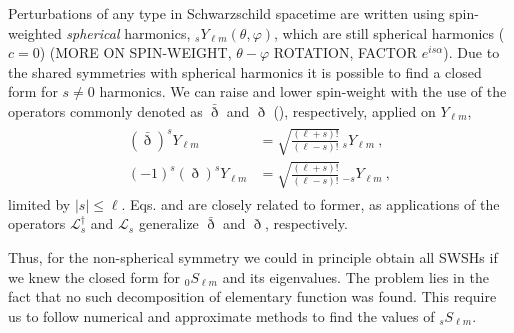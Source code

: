 Perturbations of any type in Schwarzschild spacetime are written using spin-weighted \emph{spherical} harmonics, ${}_{s}Y_{\ell m}(\theta,\varphi)$, which are still spherical harmonics ($c=0$) (MORE ON SPIN-WEIGHT, $\theta-\varphi$ ROTATION, FACTOR $e^{i s \alpha}$).
Due to the shared symmetries with spherical harmonics it is possible to find a closed form for $s\ne0$ harmonics.
We can raise and lower spin-weight with the use of the operators commonly denoted as $\bar{\eth}$ and $\eth$ (), respectively, applied on $Y_{\ell m}$,
\begin{align}
    \begin{split}
        (\bar{\eth})^s Y_{\ell m} &= \sqrt{\frac{(\ell+s)!}{(\ell-s)!}} \,{}_{s}Y_{\ell m}  ~, \\
        (-1)^s  (\eth)^s Y_{\ell m} &= \sqrt{\frac{(\ell+s)!}{(\ell-s)!}} \,{}_{-s}Y_{\ell m} ~,
    \end{split}
\end{align}
limited by $|s|\le\ell$.
Eqs.  and  are closely related to former, as applications of the operators $\mathscr{L}^\dagger_s$ and $\mathscr{L}_s$ generalize $\bar{\eth}$ and $\eth$, respectively.

Thus, for the non-spherical symmetry we could in principle obtain all SWSHs if we knew the closed form for ${}_{0}S_{\ell m}$ and its eigenvalues. The problem lies in the fact that no such decomposition of elementary function was found. This require us to follow numerical and approximate methods to find the values of ${}_{s}S_{\ell m}$.

